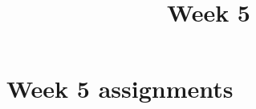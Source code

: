 \documentclass{xourse}
\title{Week 5}
\begin{document}
\begin{abstract}
\end{abstract}
\maketitle

\part{Week 5 assignments}
\end{document}
